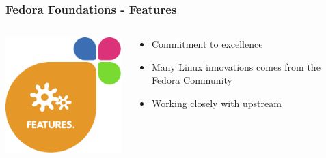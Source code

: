 \documentclass[t,aspectratio=169]{beamer}
\begin{document}
\begin{frame}
    \frametitle{Fedora Foundations - Features}
    \begin{columns}[T] %
        \begin{column}{.5\textwidth}
            \hfill\includegraphics[height=0.6\textheight]{foundations_expand_3_features.pdf}
        \end{column}
        \begin{column}{.5\textwidth}
            \begin{itemize}
                \item<2-> Commitment to excellence
                \item<3-> Many Linux innovations comes from the Fedora Community
                \item<4-> Working closely with upstream
            \end{itemize}
        \end{column}
    \end{columns}
\end{frame}
\end{document}
